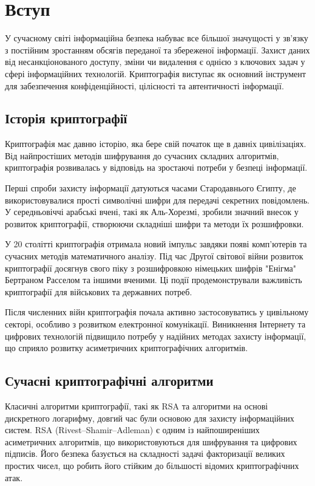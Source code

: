 \documentclass[12pt]{report}
\begin{document}
\tableofcontents

\chapter*{Вступ}

У сучасному світі інформаційна безпека набуває все більшої значущості у зв’язку з постійним зростанням обсягів переданої та збереженої інформації. Захист даних від несанкціонованого доступу, зміни чи видалення є однією з ключових задач у сфері інформаційних технологій. Криптографія виступає як основний інструмент для забезпечення конфіденційності, цілісності та автентичності інформації.

\section{Історія криптографії}

Криптографія має давню історію, яка бере свій початок ще в давніх цивілізаціях. Від найпростіших методів шифрування до сучасних складних алгоритмів, криптографія розвивалась у відповідь на зростаючі потреби у безпеці інформації.

Перші спроби захисту інформації датуються часами Стародавнього Єгипту, де використовувалися прості символічні шифри для передачі секретних повідомлень. У середньовіччі арабські вчені, такі як Аль-Хорезмі, зробили значний внесок у розвиток криптографії, створюючи складніші шифри та методи їх розшифровки.

У 20 столітті криптографія отримала новий імпульс завдяки появі комп'ютерів та сучасних методів математичного аналізу. Під час Другої світової війни розвиток криптографії досягнув свого піку з розшифровкою німецьких шифрів "Енігма"  Бертраном Расселом та іншими вченими. Ці події продемонстрували важливість криптографії для військових та державних потреб.

Після численних війн криптографія почала активно застосовуватись у цивільному секторі, особливо з розвитком електронної комунікації. Виникнення Інтернету та цифрових технологій підвищило потребу у надійних методах захисту інформації, що сприяло розвитку асиметричних криптографічних алгоритмів.

\section{Сучасні криптографічні алгоритми}

Класичні алгоритми криптографії, такі як RSA та алгоритми на основі дискретного логарифму, довгий час були основою для захисту інформаційних систем. RSA (Rivest–Shamir–Adleman) є одним із найпоширеніших асиметричних алгоритмів, що використовуються для шифрування та цифрових підписів. Його безпека базується на складності задачі факторизації великих простих чисел, що робить його стійким до більшості відомих криптографічних атак.
\end{document}
